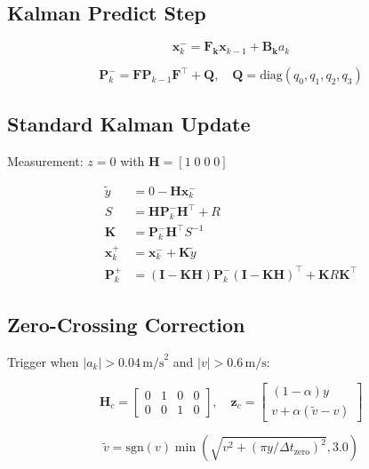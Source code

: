 \documentclass[11pt,letterpaper]{article}
\begin{document}
\subsection{Kalman Predict Step}
\begin{equation}
\bm{x}_k^- = \bm{F_{k}}\bm{x}_{k-1} + \bm{B_{k}}a_k
\end{equation}

\begin{equation}
\bm{P}_k^- = \bm{F}\bm{P}_{k-1}\bm{F}^\top + \bm{Q}, \quad 
\bm{Q} = \mathrm{diag}(q_0, q_1, q_2, q_3)
\end{equation}

\subsection{Standard Kalman Update}
Measurement: $z=0$ with $\bm{H} = [1\;0\;0\;0]$

\begin{align}
\tilde{y} &= 0 - \bm{H}\bm{x}_k^- \\
S &= \bm{H}\bm{P}_k^-\bm{H}^\top + R \\
\bm{K} &= \bm{P}_k^- \bm{H}^\top S^{-1} \\
\bm{x}_k^+ &= \bm{x}_k^- + \bm{K}\tilde{y} \\
\bm{P}_k^+ &= (\bm{I}-\bm{K}\bm{H})\bm{P}_k^-(\bm{I}-\bm{K}\bm{H})^\top + \bm{K}R\bm{K}^\top
\end{align}

\subsection{Zero-Crossing Correction}
Trigger when $|a_k| > 0.04\,\text{m/s}^2$ and $|v| > 0.6\,\text{m/s}$:

\begin{equation}
\bm{H}_c = \begin{bmatrix}0&1&0&0\\0&0&1&0\end{bmatrix}, \quad
\bm{z}_c = \begin{bmatrix}(1-\alpha)y\\v+\alpha(\tilde{v}-v)\end{bmatrix}
\end{equation}

\begin{equation}
\tilde{v} = \mathrm{sgn}(v)\min\left(\sqrt{v^2 + (\pi y/\Delta t_\mathrm{zero})^2}, 3.0\right)
\end{equation}
\end{document}
